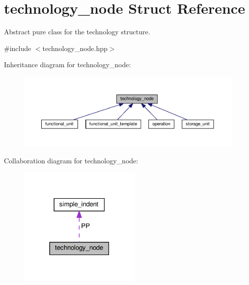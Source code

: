 \hypertarget{structtechnology__node}{}\section{technology\+\_\+node Struct Reference}
\label{structtechnology__node}


Abstract pure class for the technology structure.  




{\ttfamily \#include $<$technology\+\_\+node.\+hpp$>$}



Inheritance diagram for technology\+\_\+node\+:
\nopagebreak
\begin{figure}[H]
\begin{center}
\leavevmode
\includegraphics[width=350pt]{d6/df8/structtechnology__node__inherit__graph}
\end{center}
\end{figure}


Collaboration diagram for technology\+\_\+node\+:
\nopagebreak
\begin{figure}[H]
\begin{center}
\leavevmode
\includegraphics[width=170pt]{d1/dc8/structtechnology__node__coll__graph}
\end{center}
\end{figure}
